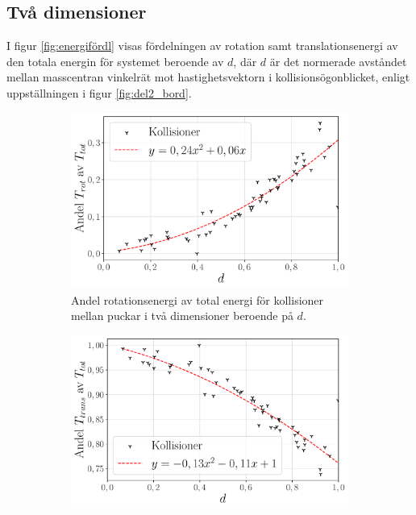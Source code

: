 \subsection{Två dimensioner}
I figur \ref{fig:energifördl} visas fördelningen av rotation samt translationsenergi av den totala energin för systemet beroende av $d$, där $d$ är det normerade avståndet mellan masscentran vinkelrät mot hastighetsvektorn i kollisionsögonblicket, enligt uppställningen i figur \ref{fig:del2_bord}.  

\begin{figure}[H]
    \begin{subfigure}{.48\textwidth}
        \centering
        \hspace*{-1.2cm}
        \includegraphics[width=1\linewidth]{images/d_rotationandel.pdf} %
        \caption{Andel rotationsenergi av total energi för kollisioner mellan puckar i två dimensioner beroende på $d$.}
        \label{fig:rot}
    \end{subfigure} 
    \hfill
    \hspace*{0.2cm}
    \begin{subfigure}{.48\textwidth}
        \centering
        \hspace*{-1.2cm}
        \includegraphics[width=1\linewidth]{images/d_translational_energy_percentage.pdf} %

\end{subfigure}
\end{figure}
